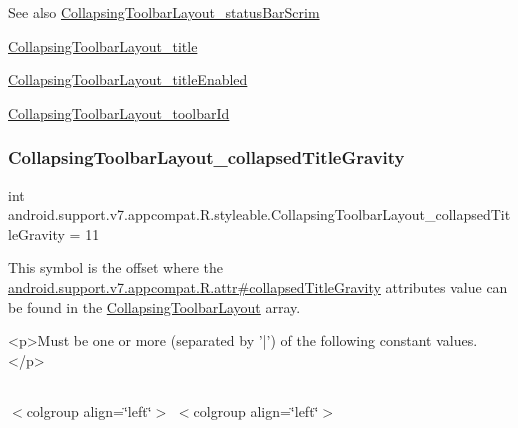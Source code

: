 \begin{DoxySeeAlso}{See also}
\hyperlink{classandroid_1_1support_1_1v7_1_1appcompat_1_1R_1_1styleable_a8dd3d1989f1de8df8670da0cf881bb53}{Collapsing\+Toolbar\+Layout\+\_\+status\+Bar\+Scrim} 

\hyperlink{classandroid_1_1support_1_1v7_1_1appcompat_1_1R_1_1styleable_a287b485120735165da1ae86c6c16c174}{Collapsing\+Toolbar\+Layout\+\_\+title} 

\hyperlink{classandroid_1_1support_1_1v7_1_1appcompat_1_1R_1_1styleable_a9dbf91222ca3cd313d450c7f1c17db70}{Collapsing\+Toolbar\+Layout\+\_\+title\+Enabled} 

\hyperlink{classandroid_1_1support_1_1v7_1_1appcompat_1_1R_1_1styleable_a9b1b730dcc059136fa07007ab41fcc78}{Collapsing\+Toolbar\+Layout\+\_\+toolbar\+Id} 
\end{DoxySeeAlso}
\mbox{\label{classandroid_1_1support_1_1v7_1_1appcompat_1_1R_1_1styleable_aca00ebe0643a3a5ded86879fbff26955}} 
\subsubsection{\texorpdfstring{Collapsing\+Toolbar\+Layout\+\_\+collapsed\+Title\+Gravity}{CollapsingToolbarLayout\_collapsedTitleGravity}}
{\footnotesize\ttfamily int android.\+support.\+v7.\+appcompat.\+R.\+styleable.\+Collapsing\+Toolbar\+Layout\+\_\+collapsed\+Title\+Gravity = 11\hspace{0.3cm}{\ttfamily [static]}}

This symbol is the offset where the \hyperlink{classandroid_1_1support_1_1v7_1_1appcompat_1_1R_1_1attr_a16879d02e8655519f27ea1d008c230e4}{android.\+support.\+v7.\+appcompat.\+R.\+attr\#collapsed\+Title\+Gravity} attribute\textquotesingle{}s value can be found in the \hyperlink{classandroid_1_1support_1_1v7_1_1appcompat_1_1R_1_1styleable_a8d282d917f35e5a08dd37db243410383}{Collapsing\+Toolbar\+Layout} array.

\begin{DoxyVerb}      <p>Must be one or more (separated by '|') of the following constant values.</p>
\end{DoxyVerb}
 \tabulinesep=1mm
\begin{longtabu} spread 0pt [c]{*{0}{|X[-1]}|}
\hline
\end{longtabu}
$<$colgroup align=\char`\"{}left\char`\"{}$>$ $<$colgroup align=\char`\"{}left\char`\"{}$>$ 

